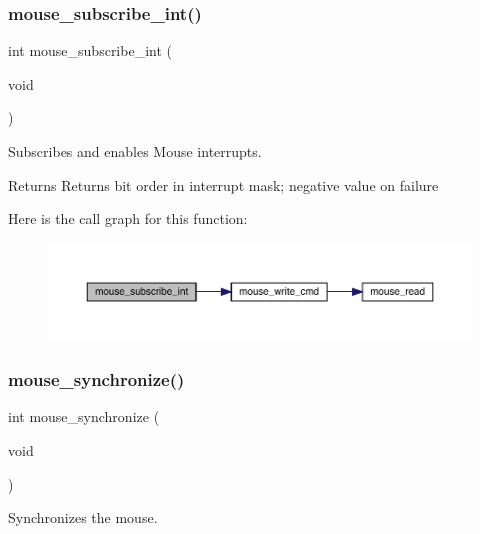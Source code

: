 \subsubsection{\texorpdfstring{mouse\+\_\+subscribe\+\_\+int()}{mouse\_subscribe\_int()}}
{\footnotesize\ttfamily int mouse\+\_\+subscribe\+\_\+int (\begin{DoxyParamCaption}\item[{void}]{ }\end{DoxyParamCaption})}



Subscribes and enables Mouse interrupts. 

\begin{DoxyReturn}{Returns}
Returns bit order in interrupt mask; negative value on failure 
\end{DoxyReturn}
Here is the call graph for this function\+:\nopagebreak
\begin{figure}[H]
\begin{center}
\leavevmode
\includegraphics[width=350pt]{group__mouse_ga51e6ee02a5c0a7e618abde7250cd0841_cgraph}
\end{center}
\end{figure}
\hypertarget{group__mouse_gacf07c98dc574238b3da9388c3dd1042a}{}\label{group__mouse_gacf07c98dc574238b3da9388c3dd1042a} 
\subsubsection{\texorpdfstring{mouse\+\_\+synchronize()}{mouse\_synchronize()}}
{\footnotesize\ttfamily int mouse\+\_\+synchronize (\begin{DoxyParamCaption}\item[{void}]{ }\end{DoxyParamCaption})}



Synchronizes the mouse. 

